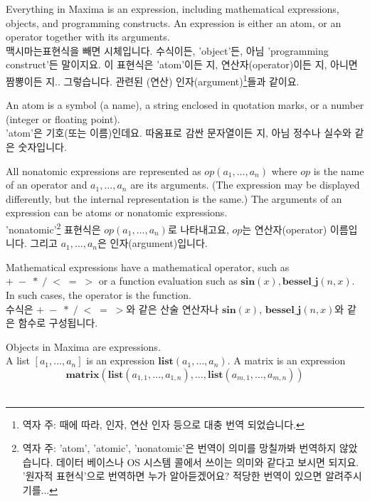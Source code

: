 \documentclass[12pt]{article}
\begin{document}
Everything in Maxima is an expression,
including mathematical expressions, objects, and programming constructs.
An expression is either an atom, or an operator together with its arguments. \\

맥시마는표현식을 빼면 시체입니다. 수식이든, 'object'든, 아님 'programming construct'든 말이지요.
이 표현식은 'atom'이든 지, 연산자(operator)이든 지, 아니면 짬뽕이든 지.. 그렇습니다. 관련된 (연산) 인자(argument)\footnote{역자 주: 때에 따라, 인자, 연산 인자 등으로 대충 번역 되었습니다.}들과 같이요.

An atom is a symbol (a name), a string enclosed in quotation marks,
or a number (integer or floating point). \\

'atom'은 기호(또는 이름)인데요. 따옴표로 감싼 문자열이든 지, 아님 정수나 실수와 같은 숫자입니다.

All nonatomic expressions are represented as $\mathit{op}(a_1, \ldots, a_n)$
where $\mathit{op}$ is the name of an operator
and $a_1, \ldots, a_n$ are its arguments.
(The expression may be displayed differently,
but the internal representation is the same.)
The arguments of an expression can be atoms or nonatomic expressions. \\

'nonatomic'\footnote{역자 주: 'atom', 'atomic', 'nonatomic'은 번역이 의미를 망칠까봐 번역하지 않았습니다. 데이터 베이스나 OS 시스템 콜에서 쓰이는 의미와 같다고 보시면 되지요. '원자적 표현식'으로 번역하면 누가 알아듣겠어요? 적당한 번역이 있으면 알려주시기를...} 표현식은 $\mathit{op}(a_1, \ldots, a_n)$로 나타내고요, 
$\mathit{op}$는 연산자(operator) 이름입니다. 그리고 $a_1, \ldots, a_n$은 인자(argument)입니다.

Mathematical expressions have a mathematical operator,
such as $+ \; - \; * \; / \; < \; = \; >$
or a function evaluation such as $\mathbf{sin}(x), \mathbf{bessel\_j}(n, x)$.
In such cases, the operator is the function. \\

수식은 $+ \; - \; * \; / \; < \; = \; >$와 같은 산술 연산자나  $\mathbf{sin}(x)$, $\mathbf{bessel\_j}(n, x)$와 같은 함수로 구성됩니다.  

Objects in Maxima are expressions. \\
A list $[a_1, \ldots, a_n]$ is an expression $\mathbf{list}(a_1, \ldots, a_n)$.
A matrix is an expression
\[
\mathbf{matrix}(\mathbf{list}(a_{1,1}, \ldots, a_{1,n}), \ldots, \mathbf{list}(a_{m,1}, \ldots, a_{m,n}))
\] \\
\end{document}
